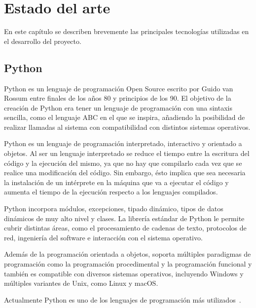 \documentclass[a4paper, 12pt]{book}
\begin{document}
\cleardoublepage
\chapter{Estado del arte}
\label{chap:estado}

En este capítulo se describen brevemente las principales tecnologías utilizadas en el desarrollo del proyecto.

\section{Python} 
\label{sec:python}
Python \cite{python} es un lenguaje de programación Open Source escrito por Guido van Rossum entre finales de los años 80 y principios de los 90. El objetivo de la creación de Python era tener un lenguaje de programación con una sintaxis sencilla, como el lenguaje ABC en el que se inspira, añadiendo la posibilidad de realizar llamadas al sistema con compatibilidad con distintos sistemas operativos.

Python es un lenguaje de programación interpretado, interactivo y orientado a objetos. Al ser un lenguaje interpretado se reduce el tiempo entre la escritura del código y la ejecución del mismo, ya que no hay que compilarlo cada vez que se realice una modificación del código. Sin embargo, ésto implica que sea necesaria la instalación de un intérprete en la máquina que va a ejecutar el código y aumenta el tiempo de la ejecución respecto a los lenguajes compilados.

Python incorpora módulos, excepciones, tipado dinámico, tipos de datos dinámicos de muy alto nivel y clases. La librería estándar de Python le permite cubrir distintas áreas, como el procesamiento de cadenas de texto, protocolos de red, ingeniería del software e interacción con el sistema operativo.

Además de la programación orientada a objetos, soporta múltiples paradigmas de programación como la programación procedimental y la programación funcional y también es compatible con diversos sistemas operativos, incluyendo Windows y múltiples variantes de Unix, como Linux y macOS.

Actualmente Python es uno de los lenguajes de programación más utilizados~\cite{stackoverflowsurvey}.
\end{document}
